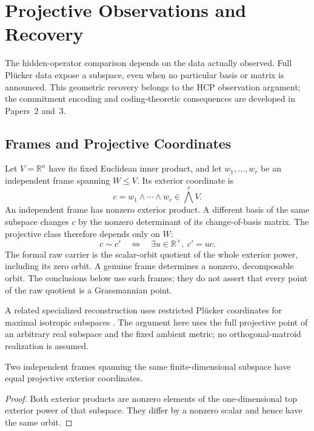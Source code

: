 \section{Projective Observations and Recovery}\label{sec:projective-observation-boundary}

The hidden-operator comparison depends on the data actually observed. Full
Pl\"ucker data expose a subspace, even when no particular basis or matrix is
announced. This geometric recovery belongs to the HCP observation argument;
the commitment encoding and coding-theoretic consequences are developed in
Papers~2 and~3.

\subsection{Frames and Projective Coordinates}

Let \(V=\mathbb R^n\) have its fixed Euclidean inner product, and let
\(w_1,\ldots,w_r\) be an independent frame spanning \(W\le V\). Its exterior
coordinate is
\[
  c=w_1\wedge\cdots\wedge w_r\in\bigwedge^r V.
\]
An independent frame has nonzero exterior product. A different basis of the
same subspace changes \(c\) by the nonzero determinant of its change-of-basis
matrix. The projective class therefore depends only on \(W\):
\[
 c\sim c'\quad\Longleftrightarrow\quad
 \exists u\in\mathbb R^\times,\ c'=uc.
\]
The formal raw carrier is the scalar-orbit quotient of the whole exterior
power, including its zero orbit. A genuine frame determines a nonzero,
decomposable orbit. The conclusions below use such frames; they do not
assert that every point of the raw quotient is a Grassmannian point.

A related specialized reconstruction uses restricted Pl\"ucker coordinates
for maximal isotropic subspaces \cite{dingKim2026plucker}. The argument here
uses the full projective point of an arbitrary real subspace and the fixed
ambient metric; no orthogonal-matroid realization is assumed.

\begin{proposition}\label{prop:plucker-invariance}
  Two independent frames spanning the same finite-dimensional subspace have
  equal projective exterior coordinates.
\end{proposition}
\begin{proof}
  Both exterior products are nonzero elements of the one-dimensional top
  exterior power of that subspace. They differ by a nonzero scalar and hence
  have the same orbit.
\end{proof}

